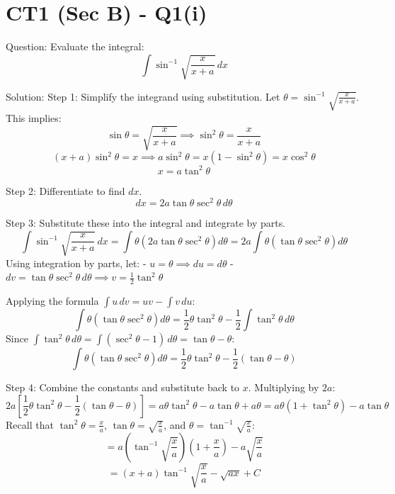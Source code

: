 \documentclass{article}
\begin{document}
\section*{CT1 (Sec B) - Q1(i)}
Question:
Evaluate the integral:
\[
\int \sin^{-1} \sqrt{\frac{x}{x+a}} \, dx
\]

Solution:
Step 1: Simplify the integrand using substitution.
Let \(\theta = \sin^{-1} \sqrt{\frac{x}{x+a}}\). This implies:
\[
\sin\theta = \sqrt{\frac{x}{x+a}} \implies \sin^2\theta = \frac{x}{x+a}
\]
\[
(x+a)\sin^2\theta = x \implies a\sin^2\theta = x(1-\sin^2\theta) = x\cos^2\theta
\]
\[
x = a\tan^2\theta
\]

Step 2: Differentiate to find \(dx\).
\[
dx = 2a\tan\theta\sec^2\theta \, d\theta
\]

Step 3: Substitute these into the integral and integrate by parts.
\[
\int \sin^{-1} \sqrt{\frac{x}{x+a}} \, dx = \int \theta \left(2a\tan\theta\sec^2\theta\right) d\theta = 2a \int \theta \left(\tan\theta\sec^2\theta\right) d\theta
\]
Using integration by parts, let:
- \(u = \theta \implies du = d\theta\)
- \(dv = \tan\theta\sec^2\theta \, d\theta \implies v = \frac{1}{2}\tan^2\theta\)

Applying the formula \(\int u \, dv = uv - \int v \, du\):
\[
\int \theta \left(\tan\theta\sec^2\theta\right) d\theta = \frac{1}{2}\theta\tan^2\theta - \frac{1}{2}\int \tan^2\theta \, d\theta
\]
Since \(\int \tan^2\theta \, d\theta = \int (\sec^2\theta - 1) \, d\theta = \tan\theta - \theta\):
\[
\int \theta \left(\tan\theta\sec^2\theta\right) d\theta = \frac{1}{2}\theta\tan^2\theta - \frac{1}{2}(\tan\theta - \theta)
\]

Step 4: Combine the constants and substitute back to \(x\).
Multiplying by \(2a\):
\[
2a \left[ \frac{1}{2}\theta\tan^2\theta - \frac{1}{2}(\tan\theta - \theta) \right] = a\theta\tan^2\theta - a\tan\theta + a\theta = a\theta(1+\tan^2\theta) - a\tan\theta
\]
Recall that \(\tan^2\theta = \frac{x}{a}\), \(\tan\theta = \sqrt{\frac{x}{a}}\), and \(\theta = \tan^{-1}\sqrt{\frac{x}{a}}\):
\[
= a\left(\tan^{-1}\sqrt{\frac{x}{a}}\right)\left(1+\frac{x}{a}\right) - a\sqrt{\frac{x}{a}}
\]
\[
= (x+a)\tan^{-1}\sqrt{\frac{x}{a}} - \sqrt{ax} + C
\]
\end{document}
